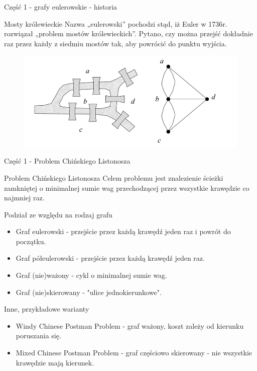 \documentclass[polish,envcountsect,10pt]{beamer}
\begin{document}
\begin{frame}{Część 1 - grafy eulerowskie - historia}
    \begin{block}{Mosty królewieckie}
        Nazwa „eulerowski” pochodzi stąd, iż Euler w 1736r. rozwiązał „problem
        mostów królewieckich”. Pytano, czy można przejść dokładnie raz przez
        każdy z siedmiu mostów tak, aby powrócić do punktu wyjścia.
    \end{block}
    \begin{figure}
        \centering
        \includegraphics[width=0.7\linewidth]{./zal_a.png}
    \end{figure}
\end{frame}

\begin{frame}{Część 1 - Problem Chińskiego Listonosza}
    \begin{block}{Problem Chińskiego Listonosza}
        Celem problemu jest znalezienie ścieżki zamkniętej o minimalnej sumie wag przechodzącej przez wszystkie krawędzie co najmniej raz.
    \end{block}
    \begin{block}{Podział ze względu na rodzaj grafu}
        \begin{itemize}
            \item Graf eulerowski - przejście przez każdą krawędź jeden raz i powrót do początku.
            \item Graf półeulerowski - przejście przez każdą krawędź jeden raz.
            \item Graf (nie)ważony - cykl o minimalnej sumie wag.
            \item Graf (nie)skierowany - "ulice jednokierunkowe".
        \end{itemize}
    \end{block}
    \begin{block}{Inne, przykładowe warianty}
        \begin{itemize}
            \item Windy Chinese Postman Problem - graf ważony, koszt zależy od kierunku poruszania się.
            \item Mixed Chinese Postman Problem - graf częściowo skierowany - nie wszystkie krawędzie mają kierunek.
        \end{itemize}
    \end{block}
\end{frame}
\end{document}

